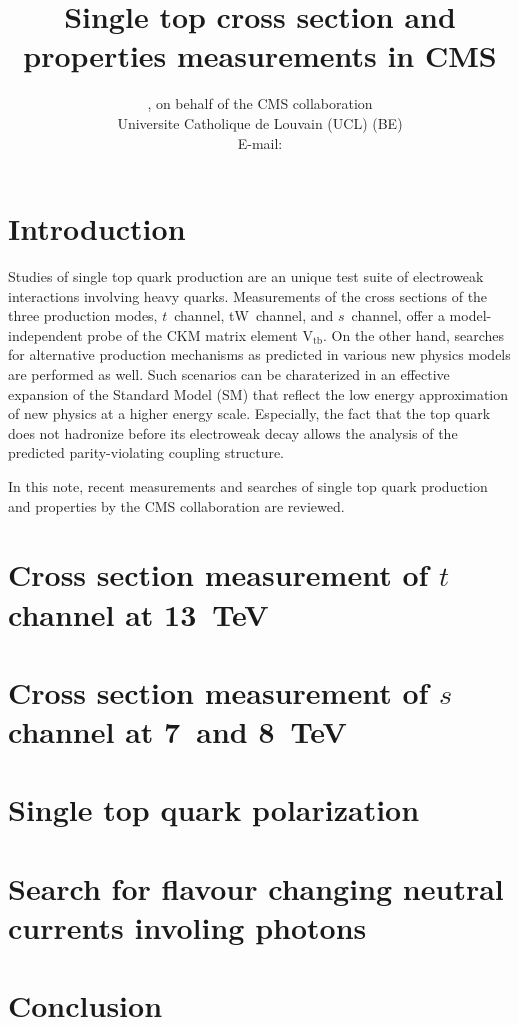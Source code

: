 \documentclass{PoS}
\title{Single top cross section and properties measurements in CMS}
\author{
    \speaker{Matthias Komm}, on behalf of the CMS collaboration\\
    Universite Catholique de Louvain (UCL) (BE)\\
    E-mail: \email{Matthias.Komm@cern.ch}
}
\begin{document}
\section{Introduction}
Studies of single top quark production are an unique test suite of electroweak interactions involving heavy quarks. Measurements of the cross sections of the three production modes, $t$~channel, tW~channel, and $s$~channel, offer a model-independent probe of the CKM matrix element $\mathrm{V}_\mathrm{tb}$. On the other hand, searches for alternative production mechanisms as predicted in various new physics models are performed as well. Such scenarios can be charaterized in an effective expansion of the Standard Model (SM) that reflect the low energy approximation of new physics at a higher energy scale. Especially, the fact that the top quark does not hadronize before its electroweak decay allows the analysis of the predicted parity-violating coupling structure.

In this note, recent measurements and searches of single top quark production and properties by the CMS collaboration are reviewed.


\section{Cross section measurement of $t$ channel at 13~TeV}
\section{Cross section measurement of $s$ channel at 7~and 8~TeV}
\section{Single top quark polarization}
\section{Search for flavour changing neutral currents involing photons}
\section{Conclusion}

\begin{thebibliography}{99}

\end{thebibliography}
\end{document}
